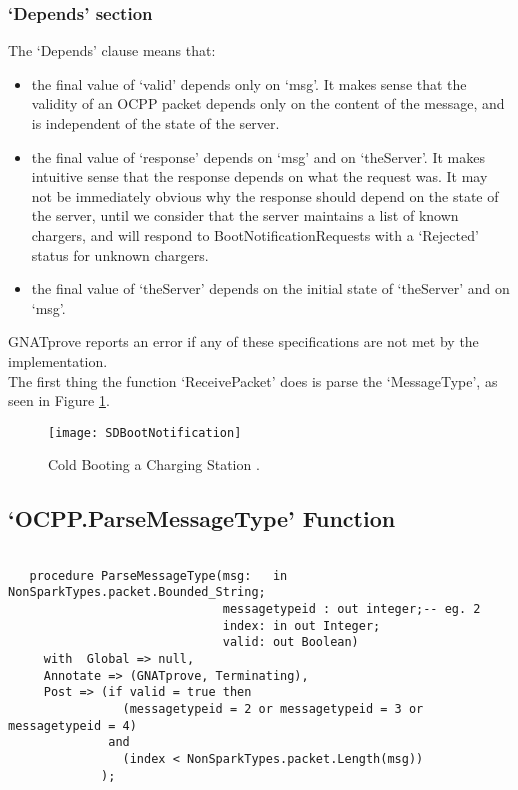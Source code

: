 \documentclass[12pt,openany,a4paper]{book}
\begin{document}
\subsubsection{`Depends' section}
The `Depends' clause means that:
\begin{itemize}
\item the final value of `valid' depends only on `msg'. It makes sense that the validity of an OCPP packet depends only on the content of the message, and is independent of the state of the server.
\item the final value of `response' depends on `msg' and on `theServer'. It makes intuitive sense that the response depends on what the request was. It may not be immediately obvious why the response should depend on the state of the server, until we consider that the server maintains a list of known chargers, and will respond to BootNotificationRequests with a `Rejected' status for unknown chargers.
\item the final value of `theServer' depends on the initial state of `theServer' and on `msg'. 
\end{itemize}

GNATprove reports an error if any of these specifications are not met by the implementation.\\


The first thing the function `ReceivePacket' does is parse the `MessageType', as seen in Figure \ref{fig:SDBootNotification}. 

	\begin{center}
		\begin{figure}[H]
			\texttt{[image: SDBootNotification]}
			\caption{Cold Booting a Charging Station \cite{ocpp2b}.}
			\label{fig:SDBootNotification}
		\end{figure}
	\end{center}

\pagebreak
\subsection{`OCPP.ParseMessageType' Function}
\begin{verbatim}

   procedure ParseMessageType(msg:   in  NonSparkTypes.packet.Bounded_String;
                              messagetypeid : out integer;-- eg. 2
                              index: in out Integer;
                              valid: out Boolean)
     with  Global => null,
     Annotate => (GNATprove, Terminating),
     Post => (if valid = true then 
                (messagetypeid = 2 or messagetypeid = 3 or messagetypeid = 4)
              and
                (index < NonSparkTypes.packet.Length(msg))
             );
\end{verbatim}
\end{document}
